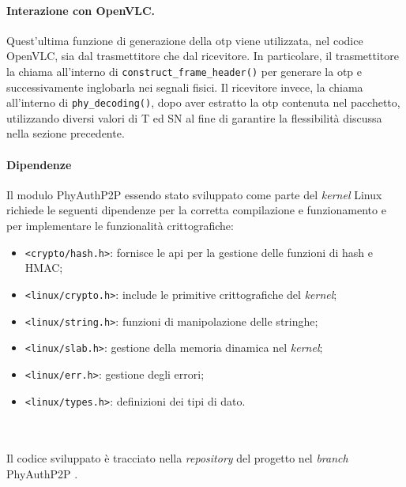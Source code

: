 \paragraph{Interazione con OpenVLC.}
Quest'ultima funzione di generazione della \gls{otp} viene utilizzata, nel codice OpenVLC, sia dal trasmettitore che dal ricevitore.
In particolare, il trasmettitore la chiama all'interno di \texttt{construct\_frame\_header()} per generare la \gls{otp} e successivamente inglobarla nei segnali fisici. Il ricevitore invece, la chiama all'interno di \texttt{phy\_decoding()}, dopo aver estratto la \gls{otp} contenuta nel pacchetto, utilizzando diversi valori di T ed SN al fine di garantire la flessibilità discussa nella sezione precedente.

\paragraph{Dipendenze}
Il modulo PhyAuthP2P essendo stato sviluppato come parte del \textit{kernel} Linux richiede le seguenti dipendenze per la corretta compilazione e funzionamento e per implementare le funzionalità crittografiche:
\begin{itemize}
    \item \texttt{<crypto/hash.h>}: fornisce le \gls{api} per la gestione delle funzioni di hash e HMAC;
    \item \texttt{<linux/crypto.h>}: include le primitive crittografiche del \textit{kernel};
    \item \texttt{<linux/string.h>}: funzioni di manipolazione delle stringhe;
    \item \texttt{<linux/slab.h>}: gestione della memoria dinamica nel \textit{kernel};
    \item \texttt{<linux/err.h>}: gestione degli errori;
    \item \texttt{<linux/types.h>}: definizioni dei tipi di dato.\\\\\\
\end{itemize}

\noindent Il codice sviluppato è tracciato nella \textit{repository} del progetto nel \textit{branch} PhyAuthP2P \cite{site:openvlc-pa-github}.
